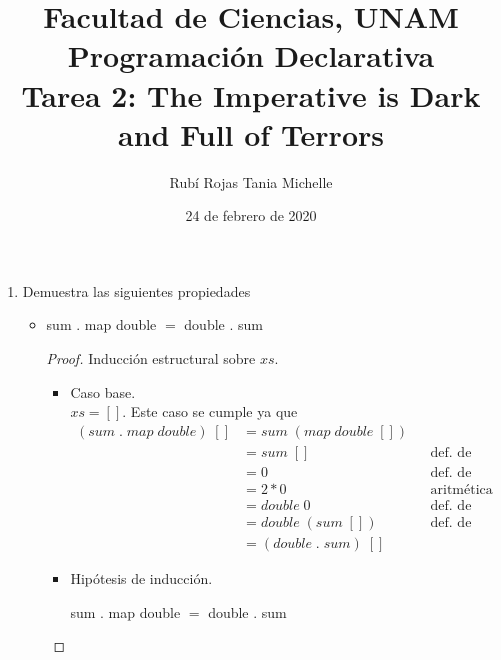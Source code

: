 \documentclass[letterpaper,11pt]{article}
\title{Facultad de Ciencias, UNAM \\
       Programación Declarativa \\ 
       Tarea 2: The Imperative is Dark and Full of Terrors}
\author{Rubí Rojas Tania Michelle}
\date{24 de febrero de 2020}
\begin{document}
\maketitle

\begin{enumerate}
    \item Demuestra las siguientes propiedades
    \begin{itemize}
        \item sum . map double $=$ double . sum
        \begin{proof} 
            Inducción estructural sobre $xs$. 
            \begin{itemize}
                \item Caso base. \\ 
                $xs = []$. Este caso se cumple ya que 
                \begin{align*}
                    (sum \; . \; map \; double) \; []
                    &= sum \; (map \; double \; []) \\
                    &= sum \; []
                    && \text{def. de map} \\ 
                    &= 0
                    && \text{def. de sum} \\ 
                    &= 2 * 0
                    && \text{aritmética} \\ 
                    &= double \; 0
                    && \text{def. de double} \\ 
                    &= double \; (sum \; [])
                    && \text{def. de sum} \\ 
                    &= (double \; . \; sum) \; []
                \end{align*}

                \item Hipótesis de inducción.
                \begin{center}
                    sum . map double $=$ double . sum
                \end{center}


\end{itemize}
\end{proof}
\end{itemize}
\end{enumerate}
\end{document}

